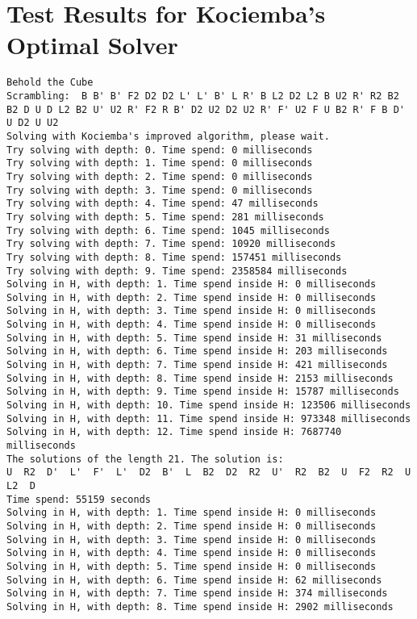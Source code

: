 \chapter{Test Results for Kociemba's Optimal Solver}
\label{chap:kociembaResults}
\emptyTop{}
\begin{lstlisting}[breaklines=true, basicstyle=\ttfamily\footnotesize]
Behold the Cube
Scrambling:  B B' B' F2 D2 D2 L' L' B' L R' B L2 D2 L2 B U2 R' R2 B2 B2 D U D L2 B2 U' U2 R' F2 R B' D2 U2 D2 U2 R' F' U2 F U B2 R' F B D' U D2 U U2
Solving with Kociemba's improved algorithm, please wait.
Try solving with depth: 0. Time spend: 0 milliseconds
Try solving with depth: 1. Time spend: 0 milliseconds
Try solving with depth: 2. Time spend: 0 milliseconds
Try solving with depth: 3. Time spend: 0 milliseconds
Try solving with depth: 4. Time spend: 47 milliseconds
Try solving with depth: 5. Time spend: 281 milliseconds
Try solving with depth: 6. Time spend: 1045 milliseconds
Try solving with depth: 7. Time spend: 10920 milliseconds
Try solving with depth: 8. Time spend: 157451 milliseconds
Try solving with depth: 9. Time spend: 2358584 milliseconds
Solving in H, with depth: 1. Time spend inside H: 0 milliseconds
Solving in H, with depth: 2. Time spend inside H: 0 milliseconds
Solving in H, with depth: 3. Time spend inside H: 0 milliseconds
Solving in H, with depth: 4. Time spend inside H: 0 milliseconds
Solving in H, with depth: 5. Time spend inside H: 31 milliseconds
Solving in H, with depth: 6. Time spend inside H: 203 milliseconds
Solving in H, with depth: 7. Time spend inside H: 421 milliseconds
Solving in H, with depth: 8. Time spend inside H: 2153 milliseconds
Solving in H, with depth: 9. Time spend inside H: 15787 milliseconds
Solving in H, with depth: 10. Time spend inside H: 123506 milliseconds
Solving in H, with depth: 11. Time spend inside H: 973348 milliseconds
Solving in H, with depth: 12. Time spend inside H: 7687740 milliseconds
The solutions of the length 21. The solution is:
U  R2  D'  L'  F'  L'  D2  B'  L  B2  D2  R2  U'  R2  B2  U  F2  R2  U  L2  D  
Time spend: 55159 seconds
Solving in H, with depth: 1. Time spend inside H: 0 milliseconds
Solving in H, with depth: 2. Time spend inside H: 0 milliseconds
Solving in H, with depth: 3. Time spend inside H: 0 milliseconds
Solving in H, with depth: 4. Time spend inside H: 0 milliseconds
Solving in H, with depth: 5. Time spend inside H: 0 milliseconds
Solving in H, with depth: 6. Time spend inside H: 62 milliseconds
Solving in H, with depth: 7. Time spend inside H: 374 milliseconds
Solving in H, with depth: 8. Time spend inside H: 2902 milliseconds

\end{lstlisting}
